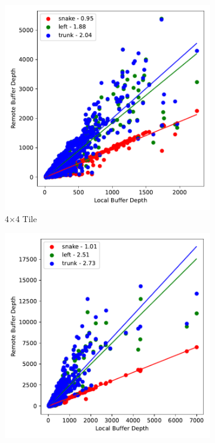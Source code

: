 \begin{figure}
  \centering
  \begin{subfigure}[b]{0.475\textwidth}
      \centering
      \includegraphics[width=\textwidth]{./images/mp60_16_slow_route_fits.pdf}
      \caption[]%
      {\small 4$\times$4 Tile}    
  \end{subfigure}
  \hfill
  \begin{subfigure}[b]{0.475\textwidth}  
      \centering 
      \includegraphics[width=\textwidth]{./images/mp60_64_slow_route_fits.pdf}

\end{subfigure}
\end{figure}
